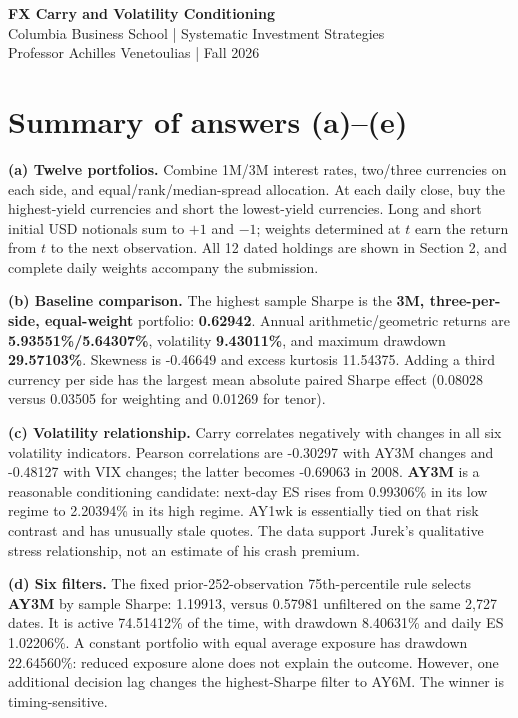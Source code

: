 \documentclass[10pt,letterpaper]{article}
\newcommand{\rBaseSharpe}{0.62942}
\newcommand{\rBaseArith}{5.93551}
\newcommand{\rBaseGeom}{5.64307}
\newcommand{\rBaseVol}{9.43011}
\newcommand{\rBaseDD}{29.57103}
\newcommand{\rBaseSkew}{-0.46649}
\newcommand{\rBaseKurt}{11.54375}
\newcommand{\rCondSharpe}{1.19913}
\newcommand{\rCondES}{1.02206}
\newcommand{\rCondDD}{8.40631}
\newcommand{\rCondActive}{74.51412}
\newcommand{\rCondBaseSharpe}{0.57981}
\newcommand{\rConstDD}{22.64560}
\newcommand{\rSizeEffect}{0.08028}
\newcommand{\rMethodEffect}{0.03505}
\newcommand{\rTenorEffect}{0.01269}
\newcommand{\rVixCorr}{-0.48127}
\newcommand{\rAYCorr}{-0.30297}
\newcommand{\rVixCrisis}{-0.69063}
\newcommand{\rLowES}{0.99306}
\newcommand{\rHighES}{2.20394}
\begin{document}
\begin{center}{\Large\bfseries FX Carry and Volatility Conditioning}\\[5pt]
Columbia Business School | Systematic Investment Strategies\\
Professor Achilles Venetoulias | Fall 2026\end{center}
\section*{Summary of answers (a)--(e)}
\textbf{(a) Twelve portfolios.} Combine 1M/3M interest rates, two/three currencies on each side,
and equal/rank/median-spread allocation. At each daily close, buy the highest-yield currencies
and short the lowest-yield currencies. Long and short initial USD notionals sum to $+1$ and $-1$;
weights determined at $t$ earn the return from $t$ to the next observation. All 12 dated holdings
are shown in Section 2, and complete daily weights accompany the submission.

\textbf{(b) Baseline comparison.} The highest sample Sharpe is the \textbf{3M, three-per-side,
equal-weight} portfolio: \textbf{\rBaseSharpe{}}. Annual arithmetic/geometric returns are
\textbf{\rBaseArith{}\%/\rBaseGeom{}\%}, volatility \textbf{\rBaseVol{}\%}, and maximum drawdown
\textbf{\rBaseDD{}\%}. Skewness is \rBaseSkew{} and excess kurtosis \rBaseKurt{}.
Adding a third currency per side has the largest mean absolute paired Sharpe effect
(\rSizeEffect{} versus \rMethodEffect{} for weighting and \rTenorEffect{} for tenor).

\textbf{(c) Volatility relationship.} Carry correlates negatively with changes in all six
volatility indicators. Pearson correlations are \rAYCorr{} with AY3M changes and \rVixCorr{}
with VIX changes; the latter becomes \rVixCrisis{} in 2008. \textbf{AY3M} is a reasonable
conditioning candidate: next-day ES rises from \rLowES{}\% in its low regime to \rHighES{}\%
in its high regime. AY1wk is essentially tied on that risk contrast and has unusually stale quotes.
The data support Jurek's qualitative stress relationship, not an estimate of his crash premium.

\textbf{(d) Six filters.} The fixed prior-252-observation 75th-percentile rule selects
\textbf{AY3M} by sample Sharpe: \rCondSharpe{}, versus \rCondBaseSharpe{} unfiltered on the same
2,727 dates. It is active \rCondActive{}\% of the time, with drawdown \rCondDD{}\% and daily
ES \rCondES{}\%. A constant portfolio with equal average exposure has drawdown \rConstDD{}\%:
reduced exposure alone does not explain the outcome. However, one additional decision lag
changes the highest-Sharpe filter to AY6M. The winner is timing-sensitive.
\end{document}
